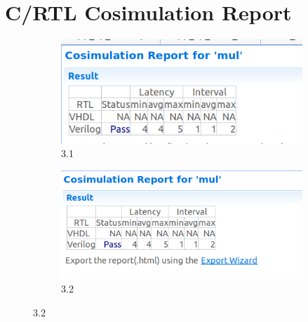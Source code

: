 \documentclass{article}
\begin{document}
\section{C/RTL Cosimulation Report}
\vspace{1cm}
\begin{figure}[h]
\centering
\begin{subfigure}[b]{0.8\textwidth}
    \centering
\includegraphics[width=\textwidth]{figs/34a.png}
    \caption{3.1}
    \label{fig:my_label}
\end{subfigure}
\hfill
\begin{subfigure}[b]{0.8\textwidth}
    \centering
\includegraphics[width=\textwidth]{figs/34b.png}
    \caption{3.2}
    \label{fig:my_label}
\end{subfigure}
\end{figure}

\vspace{5cm}
\end{document}
